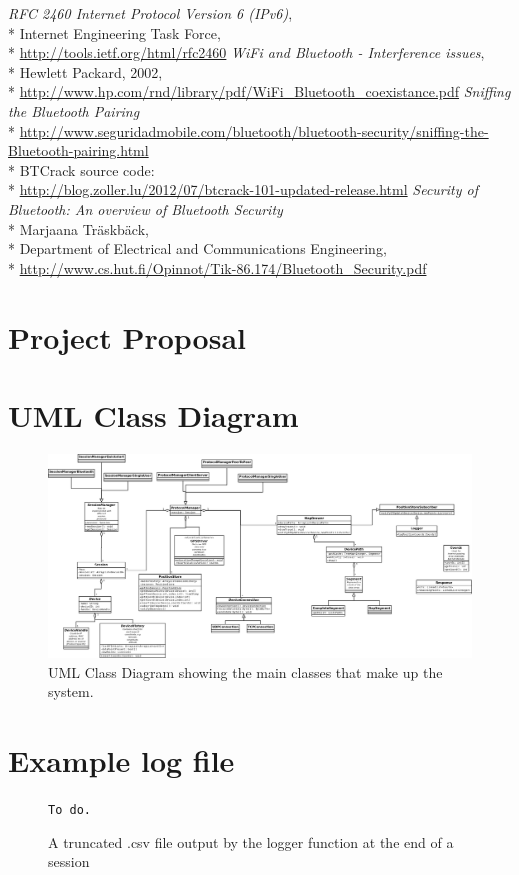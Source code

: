 \begin{thebibliography}{9}
 \emph{RFC 2460 Internet Protocol Version 6 (IPv6)},\\*
 Internet Engineering Task Force,\\*
 \url{http://tools.ietf.org/html/rfc2460}
 \emph{WiFi and Bluetooth - Interference issues},\\*
 Hewlett Packard, 2002,\\*
 \url{http://www.hp.com/rnd/library/pdf/WiFi_Bluetooth_coexistance.pdf}
 \emph{Sniffing the Bluetooth Pairing}\\*
 \url{http://www.seguridadmobile.com/bluetooth/bluetooth-security/sniffing-the-Bluetooth-pairing.html}\\*
 BTCrack source code:\\* \url{http://blog.zoller.lu/2012/07/btcrack-101-updated-release.html}
  \emph{Security of Bluetooth: An overview of Bluetooth Security}\\*
  Marjaana Träskbäck,\\*
  Department of Electrical and Communications Engineering,\\*
  \url{http://www.cs.hut.fi/Opinnot/Tik-86.174/Bluetooth_Security.pdf}

\end{thebibliography}


%
\cleardoublepage

\appendix

\chapter{Project Proposal}

%

\chapter{UML Class Diagram}

\begin{figure}
\centering
\includegraphics[angle = 90, scale=0.17]{UMLClassDiagram}
\caption{UML Class Diagram showing the main classes that make up the system.}
\label{fig:uml}
\end{figure}

\chapter{Example log file}

\begin{figure}
{\tt To do.}
\caption{A truncated .csv file output by the logger function at the end of a session}
\label{csv}
\end{figure}


